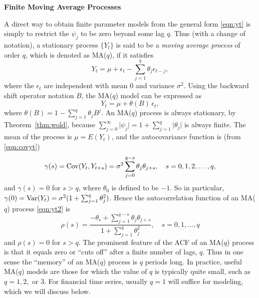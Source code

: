\noindent \textbf{Finite Moving Average Processes} \twomedskip


A direct way to obtain finite parameter models from the general form \eqref{eqn:yt} is simply to restrict the $\psi_j$ to be zero beyond some lag $q$. Thus (with a change of notation), a stationary process $\{ Y_t \}$ is said to be a \emph{moving average process} of order $q$, which is denoted as MA($q$), if it satisfies
	\begin{equation} \label{eqn:yt2}
	Y_t = \mu + \epsilon_t - \sum_{j=1}^{q} \theta_j \epsilon_{t-j},
	\end{equation}
where the $\epsilon_t$ are independent with mean 0 and variance $\sigma^2$. Using the backward shift operator notation $B$, the MA($q$) model can be expressed as
	\begin{equation*}
         Y_t= \mu + \theta(B) \, \epsilon_t,	
	\end{equation*}
where $\theta(B) = 1 - \sum_{j=1}^q \theta_j B^j$.  An MA($q$)  process is always stationary, by Theorem~\ref{thm:wold}, because $\sum_{j=0}^{\infty} \lvert \psi_j \rvert= 1 + \sum_{j=1}^q \lvert \theta_j \rvert$ is always finite. The mean of the process is $\mu = E(Y_t)$, and the autocovariance function is (from \eqref{eqn:covyt})
	\begin{equation*}
            \gamma(s)= \operatorname{Cov} (Y_t, Y_{t+s})= \sigma^2 \sum_{j=0}^{q-s} \theta_j \theta_{j+s}, \quad s = 0, 1, 2, \ldots, q,	
	\end{equation*}
and $\gamma(s)= 0$ for $s > q$, where $\theta_0$ is defined to be $-1$. So in particular, $\gamma(0)=  \operatorname{Var}(Y_t) = \sigma^2 (1 + \sum_{j=1}^q \theta_j^2)$. Hence the autocorrelation function of an MA($q$) process \eqref{eqn:yt2} is
       \begin{equation} \label{eqn:rhos}
	\rho(s) = \dfrac{-\theta_s + \sum_{j=1}^{q-s} \theta_j \theta_{j+s}}{1 + \sum_{j=1}^q \theta_j^2}, \quad s = 0,1,\ldots, q
       \end{equation}
and $\rho(s)= 0$ for $s > q$. The prominent feature of the ACF of an MA($q$) process is that it equals zero or ``cuts off'' after a finite number of lags, $q$. Thus in one sense the ``memory'' of an MA($q$) process is $q$ periods long. In practice, useful MA($q$) models are those for which the value of $q$ is typically quite small, such as $q= 1, 2,$ or $3$.  For financial time series, usually $q= 1$ will suffice for modeling, which we will discuss below. 


